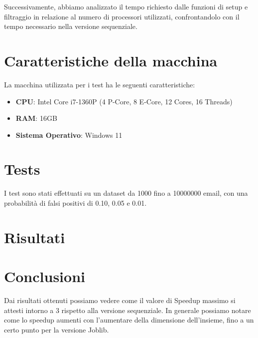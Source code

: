 \documentclass[11pt]{article}
\begin{document}
    Successivamente, abbiamo analizzato il tempo richiesto dalle funzioni di setup e filtraggio in relazione al numero
    di processori utilizzati, confrontandolo con il tempo necessario nella versione sequenziale.
    
    

    \section{Caratteristiche della macchina}\label{sec:caratteristiche-della-macchina}
    La macchina utilizzata per i test ha le seguenti caratteristiche:
    \begin{itemize}
        \item \textbf{CPU}: Intel Core i7-1360P (4 P-Core, 8 E-Core, 12 Cores, 16 Threads)
        \item \textbf{RAM}: 16GB
        \item \textbf{Sistema Operativo}: Windows 11
    \end{itemize}

    \section{Tests}\label{sec:tests}
    I test sono stati effettuati su un dataset da 1000 fino a 10000000 email, con una probabilità di falsi positivi di
    0.10, 0.05 e 0.01.

    \section{Risultati}\label{sec:risultati}
    

    \section{Conclusioni}\label{sec:conclusioni}
    Dai risultati ottenuti possiamo vedere come il valore di Speedup massimo si attesti intorno a 3 rispetto alla versione sequenziale.
    In generale possiamo notare come lo speedup aumenti con l'aumentare della dimensione dell'insieme, fino a un certo punto per la versione Joblib.
\end{document}
